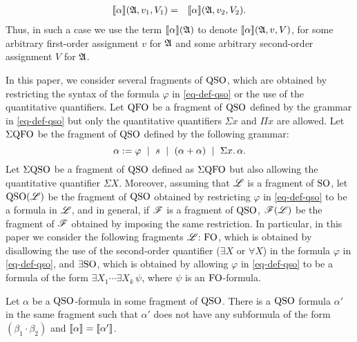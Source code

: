 \begin{eqnarray*}
	{\llbracket{}{\alpha}\rrbracket}(\mathfrak{A}, v_1, V_1) & = & {\llbracket{}{\alpha}\rrbracket}(\mathfrak{A}, v_2, V_2).
\end{eqnarray*}
Thus, in such a case we use the term ${\llbracket{}{\alpha}\rrbracket}(\mathfrak{A})$ to denote ${\llbracket{}{\alpha}\rrbracket}(\mathfrak{A}, v, V)$, for some arbitrary first-order assignment $v$ for $\mathfrak{A}$ and some arbitrary second-order assignment $V$ for $\mathfrak{A}$. 

In this paper, we consider several fragments of ${\rm QSO}$, which are obtained by restricting the syntax of the formula $\varphi$ in \eqref{eq-def-qso} or the use of the quantitative quantifiers. Let ${\rm QFO}$ be a fragment of ${\rm QSO}$ defined by the grammar in \eqref{eq-def-qso} but only the quantitative quantifiers $\Sigma x$ and $\Pi x$ are allowed. Let $\Sigma{\rm QFO}$ be the fragment of ${\rm QSO}$ defined by the following grammar:
$$
\alpha := \varphi \ \mid \ s \ \mid \ (\alpha + \alpha) \ \mid \ \Sigma{x}.\, \alpha.
$$ Let $\Sigma{\rm QSO}$ be a fragment of ${\rm QSO}$ defined as $\Sigma{\rm QFO}$ but also allowing the quantitative quantifier $\Sigma X$. Moreover, assuming that $\mathscr{L}$ is a fragment of ${\rm SO}$, let ${\rm QSO}(\mathscr{L})$ be the fragment of ${\rm QSO}$ obtained by restricting $\varphi$ in \eqref{eq-def-qso} to be a formula in $\mathscr{L}$, and in general, if $\mathscr{F}$ is a fragment of ${\rm QSO}$, $\mathscr{F}(\mathscr{L})$ be the fragment of $\mathscr{F}$ obtained by imposing the same restriction. In particular, in this paper we consider the following fragments $\mathscr{L}$: ${\rm FO}$, which is obtained by disallowing the use of the second-order quantifier ($\exists X$ or $\forall X$) in the formula $\varphi$ in \eqref{eq-def-qso}, and $\exists{\rm SO}$, which is obtained by allowing $\varphi$ in \eqref{eq-def-qso} to be a formula of the form $\exists X_1 \cdots \exists X_k \, \psi$, where $\psi$ is an ${\rm FO}$-formula. 

\begin{theorem} \label{no-mult}
	Let $\alpha$ be a ${\rm QSO}$-formula in some fragment of ${\rm QSO}$. There is a ${\rm QSO}$ formula $\alpha'$ in the same fragment such that $\alpha'$ does not have any subformula of the form $(\beta_1 \cdot \beta_2)$ and ${\llbracket{}{\alpha}\rrbracket} = {\llbracket{}{\alpha'}\rrbracket}$.
\end{theorem}
